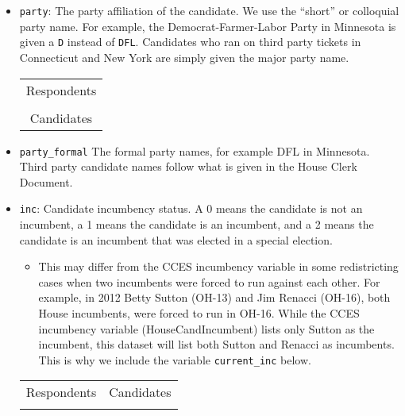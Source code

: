 \documentclass[12pt]{article}
\newcommand{\skcomment}[1]{\textcolor{blue}{\textbf{SK: #1}}}
\begin{document}
\begin{itemize}[leftmargin=*]
\item \texttt{party}: The party affiliation of the candidate. We use the ``short'' or colloquial party name. For example, the Democrat-Farmer-Labor Party in Minnesota is given a \texttt{D} instead of \texttt{DFL}. Candidates who ran on third party tickets in Connecticut and New York are simply given the major party name.   %



\begin{tabularx}{\linewidth}{C}
  Respondents\\
  \\\addlinespace
  Candidates\\
  
\end{tabularx}

\item \texttt{party\_formal} The formal party names, for example DFL in Minnesota. Third party candidate names follow what is given in the House Clerk Document. 

\item \texttt{inc}: Candidate incumbency status. A 0 means the candidate is not an incumbent, a 1 means the candidate is an incumbent, and a 2 means the candidate is an incumbent that was elected in a special election. 
\begin{itemize}
\item This may differ from the CCES incumbency variable in some redistricting cases when two incumbents were forced to run against each other. For example, in 2012 Betty Sutton (OH-13) and Jim Renacci (OH-16), both House incumbents, were forced to run in OH-16. While the CCES incumbency variable (HouseCandIncumbent) lists only Sutton as the incumbent, this dataset will list both Sutton and Renacci as incumbents. This is why we include the variable  \texttt{current\_inc} below.  
\end{itemize}

    \begin{tabularx}{\linewidth}{CC}
    Respondents & Candidates\\
     & 
    
    \end{tabularx}


\end{itemize}
\end{document}
